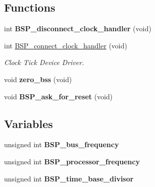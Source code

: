 \subsection*{Functions}
\begin{DoxyCompactItemize}
\item 
\mbox{\label{group__RTEMSBSPsPowerPCVirtex5_ga5b6f7a1b73b76ef80251fd770905d0c1}} 
int {\bfseries B\+S\+P\+\_\+disconnect\+\_\+clock\+\_\+handler} (void)
\item 
int \mbox{\hyperlink{group__RTEMSBSPsPowerPCVirtex5_ga7e99fec6e3bd9986094a2de9cc0b110a}{B\+S\+P\+\_\+connect\+\_\+clock\+\_\+handler}} (void)
\begin{DoxyCompactList}\small\item\em Clock Tick Device Driver. \end{DoxyCompactList}\item 
\mbox{\label{group__RTEMSBSPsPowerPCVirtex5_gaa1c249f197a325121cc9678b1665c29b}} 
void {\bfseries zero\+\_\+bss} (void)
\item 
\mbox{\label{group__RTEMSBSPsPowerPCVirtex5_gaf29d6f154e6df205a41b7196b6eac0b8}} 
void {\bfseries B\+S\+P\+\_\+ask\+\_\+for\+\_\+reset} (void)
\end{DoxyCompactItemize}
\subsection*{Variables}
\begin{DoxyCompactItemize}
\item 
\mbox{\label{group__RTEMSBSPsPowerPCVirtex5_gacebd8212ca7912c89b531e7abaeb8389}} 
unsigned int {\bfseries B\+S\+P\+\_\+bus\+\_\+frequency}
\item 
\mbox{\label{group__RTEMSBSPsPowerPCVirtex5_ga7a8f6379809948b0b0027d0a7b37755f}} 
unsigned int {\bfseries B\+S\+P\+\_\+processor\+\_\+frequency}
\item 
\mbox{\label{group__RTEMSBSPsPowerPCVirtex5_ga98a2dadc74a0a129fcdb66f5e97e01c5}} 
unsigned int {\bfseries B\+S\+P\+\_\+time\+\_\+base\+\_\+divisor}
\end{DoxyCompactItemize}


